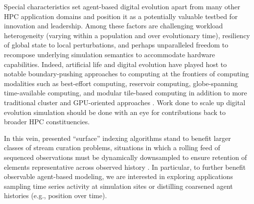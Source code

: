 Special characteristics set agent-based digital evolution apart from many other HPC application domains and position it as a potentially valuable testbed for innovation and leadership.
Among these factors are challenging workload heterogeneity (varying within a population and over evolutionary time), resiliency of global state to local perturbations, and perhaps unparalleled freedom to recompose underlying simulation semantics to accommodate hardware capabilities.
Indeed, artificial life and digital evolution have played host to notable boundary-pushing approaches to computing at the frontiers of computing modalities such as best-effort computing, reservoir computing, globe-spanning time-available computing, and modular tile-based computing in addition to more traditional cluster and GPU-oriented approaches \citep{moreno2021conduit,ackley2020best,ackley2023robust,heinemann2008artificial,miikkulainen2024evolving}.
Work done to scale up digital evolution simulation should be done with an eye for contributions back to broader HPC constituencies.



In this vein, presented ``surface'' indexing algorithms stand to benefit larger classes of stream curation problems, situations in which a rolling feed of sequenced observations must be dynamically downsampled to ensure retention of elements representative across observed history \citep{moreno2024algorithms}.
In particular, to further benefit observable agent-based modeling, we are interested in exploring applications sampling time series activity at simulation sites or distilling coarsened agent histories (e.g., position over time).

